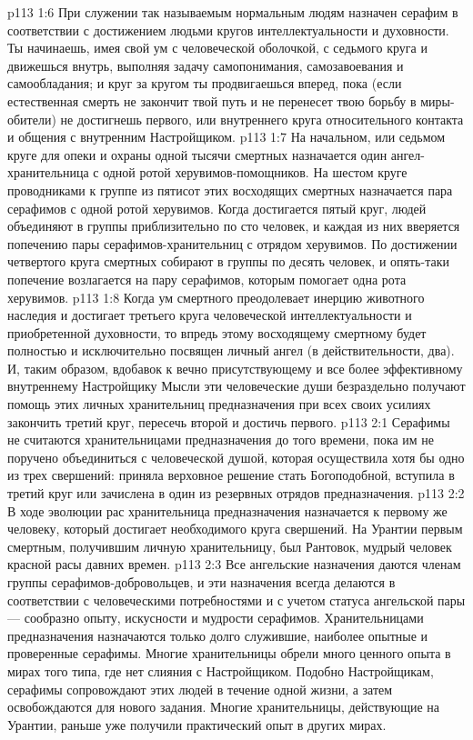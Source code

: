 \vs p113 1:6 \pc При служении так называемым нормальным людям назначен серафим в соответствии с достижением людьми кругов интеллектуальности и духовности. Ты начинаешь, имея свой ум с человеческой оболочкой, с седьмого круга и движешься внутрь, выполняя задачу самопонимания, самозавоевания и самообладания; и круг за кругом ты продвигаешься вперед, пока (если естественная смерть не закончит твой путь и не перенесет твою борьбу в миры\hyp{}обители) не достигнешь первого, или внутреннего круга относительного контакта и общения с внутренним Настройщиком.
\vs p113 1:7 На начальном, или седьмом круге для опеки и охраны одной тысячи смертных назначается один ангел\hyp{}хранительница с одной ротой херувимов\hyp{}помощников. На шестом круге проводниками к группе из пятисот этих восходящих смертных назначается пара серафимов с одной ротой херувимов. Когда достигается пятый круг, людей объединяют в группы приблизительно по сто человек, и каждая из них вверяется попечению пары серафимов\hyp{}хранительниц с отрядом херувимов. По достижении четвертого круга смертных собирают в группы по десять человек, и опять\hyp{}таки попечение возлагается на пару серафимов, которым помогает одна рота херувимов.
\vs p113 1:8 Когда ум смертного преодолевает инерцию животного наследия и достигает третьего круга человеческой интеллектуальности и приобретенной духовности, то впредь этому восходящему смертному будет полностью и исключительно посвящен личный ангел (в действительности, два). И, таким образом, вдобавок к вечно присутствующему и все более эффективному внутреннему Настройщику Мысли эти человеческие души безраздельно получают помощь этих личных хранительниц предназначения при всех своих усилиях закончить третий круг, пересечь второй и достичь первого.
\vs p113 2:1 Серафимы не считаются хранительницами предназначения до того времени, пока им не поручено объединиться с человеческой душой, которая осуществила хотя бы одно из трех свершений: приняла верховное решение стать Богоподобной, вступила в третий круг или зачислена в один из резервных отрядов предназначения.
\vs p113 2:2 В ходе эволюции рас хранительница предназначения назначается к первому же человеку, который достигает необходимого круга свершений. На Урантии первым смертным, получившим личную хранительницу, был Рантовок, мудрый человек красной расы давних времен.
\vs p113 2:3 Все ангельские назначения даются членам группы серафимов\hyp{}добровольцев, и эти назначения всегда делаются в соответствии с человеческими потребностями и с учетом статуса ангельской пары --- сообразно опыту, искусности и мудрости серафимов. Хранительницами предназначения назначаются только долго служившие, наиболее опытные и проверенные серафимы. Многие хранительницы обрели много ценного опыта в мирах того типа, где нет слияния с Настройщиком. Подобно Настройщикам, серафимы сопровождают этих людей в течение одной жизни, а затем освобождаются для нового задания. Многие хранительницы, действующие на Урантии, раньше уже получили практический опыт в других мирах.
